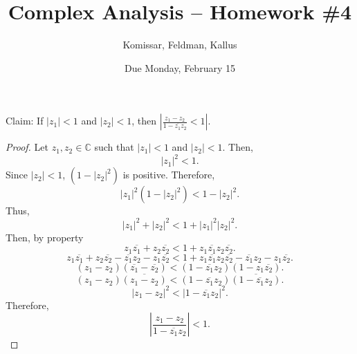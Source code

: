 \documentclass[11pt]{article}       %
\title{Complex Analysis -- Homework \#4}
\author{ Komissar, Feldman, Kallus }
\date{ Due Monday, February 15 }
\theoremstyle{definition}
\begin{document}
\pagecolor{black}
\color{white}
\maketitle

 Claim: If $|z_1| < 1$ and $|z_2| < 1$, then $\left| \frac{z_1 - z_2}{1 - \overline{z_1}z_2} < 1 \right|$.
\begin{proof}
    Let $z_1, z_2 \in \mathbb C$ such that $|z_1| < 1$ and $|z_2| < 1$.
    Then, $$|z_1|^2 < 1.$$
    Since $|z_2| < 1$, $(1-|z_2|^2)$ is positive.
    Therefore, $$|z_1|^2(1-|z_2|^2) < 1 - |z_2|^2.$$
    Thus, $$|z_1|^2 + |z_2|^2 < 1 + |z_1|^2|z_2|^2.$$
    Then, by property
    $$z_1\overline{z_1} + z_2\overline{z_2} < 1 + z_1\overline{z_1}z_2\overline{z_2}.$$
    $$z_1\overline{z_1} + z_2\overline{z_2} - \overline{z_1}z_2 - z_1\overline{z_2} < 1 + z_1\overline{z_1}z_2\overline{z_2} - \overline{z_1}z_2 - z_1\overline{z_2}.$$
    $$(z_1 - z_2)(\overline{z_1} - \overline{z_2}) < (1 - \overline{z_1}z_2)(1 - z_1\overline{z_2}).$$
    $$(z_1 - z_2)\overline{(z_1 - z_2)} < (1 - \overline{z_1}z_2)\overline{(1 - \overline{z_1}z_2)}.$$
    $$|z_1 - z_2|^2 < |1-\overline{z_1}z_2|^2.$$
    Therefore, $$\left|\frac{z_1 - z_2}{1-\overline{z_1}z_2}\right| < 1.$$
\end{proof}
\end{document}

